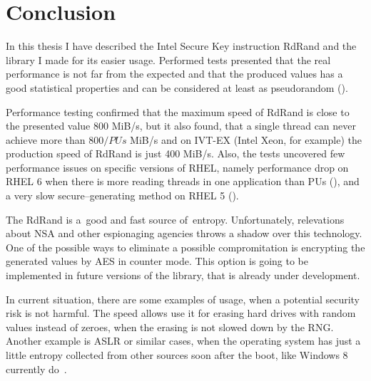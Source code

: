 \chapter{Conclusion}
\par{
In this thesis I have described the Intel Secure Key instruction RdRand and the library I made for its easier usage. Performed tests presented that the real performance is not far from the expected and that the produced values has a good statistical properties and can be considered at least as pseudorandom ().
}

\par{
Performance testing confirmed that the maximum speed of RdRand is close to the presented value 800 MiB/s, but it also found, that a single thread can never achieve more than $800 / PUs$ MiB/s and on IVT-EX (Intel Xeon, for example) the production speed of RdRand is just 400 MiB/s. Also, the tests uncovered few performance issues on specific versions of RHEL, namely performance drop on RHEL 6 when there is more reading threads in one application than PUs (), and a very slow secure--generating method on RHEL 5 ().
}

\par{
The RdRand is a~good and fast source of~entropy. Unfortunately, relevations about NSA and other espionaging agencies throws a shadow over this technology. One of the possible ways to eliminate a possible compromitation is encrypting the generated values by AES in counter mode. This option is going to be implemented in future versions of the library, that is already under development.
}

\par{
In current situation, there are some examples of usage, when a potential security risk is not harmful. The speed allows use it for erasing hard drives with random values instead of zeroes, when the erasing is not slowed down by the RNG. Another example is ASLR or similar cases, when the operating system has just a little entropy collected from other sources soon after the boot, like Windows 8 currently do~\cite{WindowsASLR}.
}

